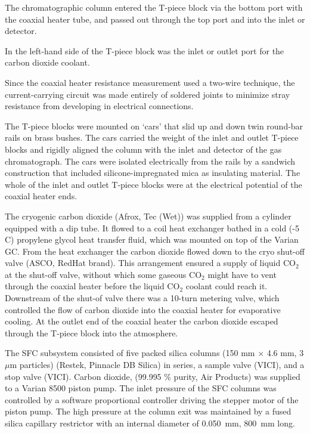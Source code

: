 \documentclass[aip,rsi,preprint,graphicx]{revtex4-1} %
\begin{document}
The chromatographic column entered the T-piece block via the bottom port with the
coaxial heater tube, and passed out through the top port and into the inlet or
detector.


In the left-hand side of the T-piece block was the inlet or outlet port for the
carbon dioxide coolant.

Since the coaxial heater resistance measurement used a two-wire technique, the
current-carrying circuit was made entirely of soldered joints to minimize stray
resistance from developing in electrical connections.

The T-piece blocks were mounted on `cars' that slid up and down twin round-bar
rails on brass bushes. The cars carried the weight of the inlet and outlet
T-piece blocks and rigidly aligned the column with the inlet and detector of the
gas chromatograph. The cars were isolated electrically from the rails by a
sandwich construction that included silicone-impregnated mica as insulating material. The
whole of the inlet and outlet T-piece blocks were at the electrical potential of
the coaxial heater ends.

The cryogenic carbon dioxide (Afrox, Tec (Wet)) was supplied from a cylinder
equipped with a dip tube. It flowed to a coil heat exchanger bathed in a cold
(-5 \textdegree C) propylene glycol heat transfer fluid, which was mounted on
top of the Varian GC. From the heat exchanger the carbon dioxide flowed down to
the cryo shut-off valve (ASCO, RedHat brand). This arrangement ensured a supply
of liquid CO$_2$ at the shut-off valve, without which some gaseous CO$_2$ might
have to vent through the coaxial heater before the liquid CO$_2$ coolant could
reach it. Downstream of the shut-of valve there was a 10-turn metering valve,
which controlled the flow of carbon dioxide into the coaxial heater for
evaporative cooling. At the outlet end of the coaxial heater the carbon dioxide
escaped through the T-piece block into the atmosphere.

The SFC subsystem consisted of five packed silica columns (150 mm × 4.6
mm, 3 $\mu$m particles) (Restek, Pinnacle DB Silica) in series, a sample valve
(VICI), and a stop valve (VICI). Carbon dioxide, (99.995 \% purity, Air
Products) was supplied to a Varian 8500 piston pump. The inlet pressure of the
SFC columns was controlled by a software proportional controller driving the
stepper motor of the piston pump. The high pressure at the column exit was
maintained by a fused silica capillary restrictor with an internal diameter of
\SI{0.050}{\milli\metre}, \SI{800}{\milli\metre} long.
\end{document}
